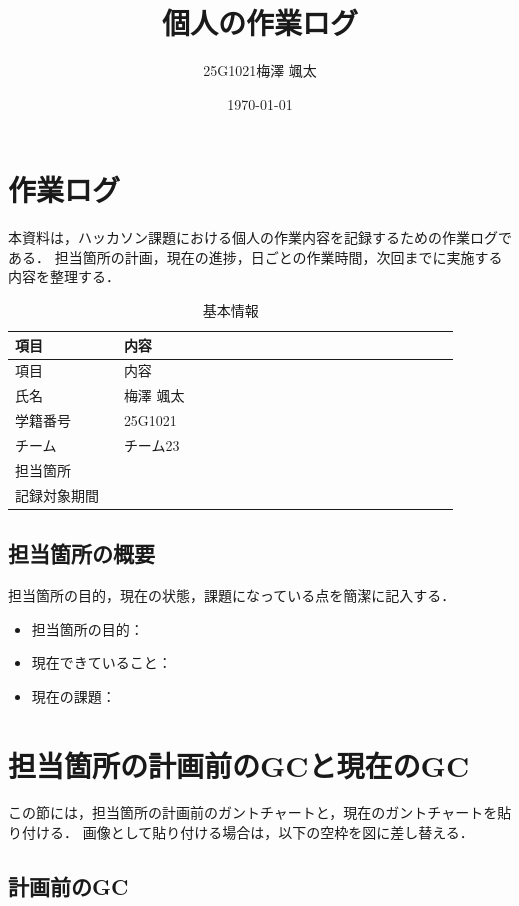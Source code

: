 \documentclass[a4paper,11pt]{ltjsarticle}
\title{個人の作業ログ}
\author{25G1021\quad 梅澤 颯太}
\date{\today}
\newcommand{\blankline}{\rule{0pt}{1.8em}\hrulefill}
\begin{document}
\maketitle
\tableofcontents
\newpage

\section{作業ログ}

本資料は，ハッカソン課題における個人の作業内容を記録するための作業ログである．
担当箇所の計画，現在の進捗，日ごとの作業時間，次回までに実施する内容を整理する．

\begin{longtable}{p{0.22\linewidth}p{0.68\linewidth}}
\caption{基本情報}\\
\toprule
項目 & 内容 \\
\midrule
\endfirsthead
\toprule
項目 & 内容 \\
\midrule
\endhead
氏名 & 梅澤 颯太 \\
学籍番号 & 25G1021 \\
チーム & チーム23 \\
担当箇所 & \blankline \\
記録対象期間 & \blankline \\
\bottomrule
\end{longtable}

\subsection{担当箇所の概要}

担当箇所の目的，現在の状態，課題になっている点を簡潔に記入する．

\begin{itemize}
  \item 担当箇所の目的：\blankline
  \item 現在できていること：\blankline
  \item 現在の課題：\blankline
\end{itemize}

\section{担当箇所の計画前のGCと現在のGC}

この節には，担当箇所の計画前のガントチャートと，現在のガントチャートを貼り付ける．
画像として貼り付ける場合は，以下の空枠を図に差し替える．

\subsection{計画前のGC}
\end{document}
